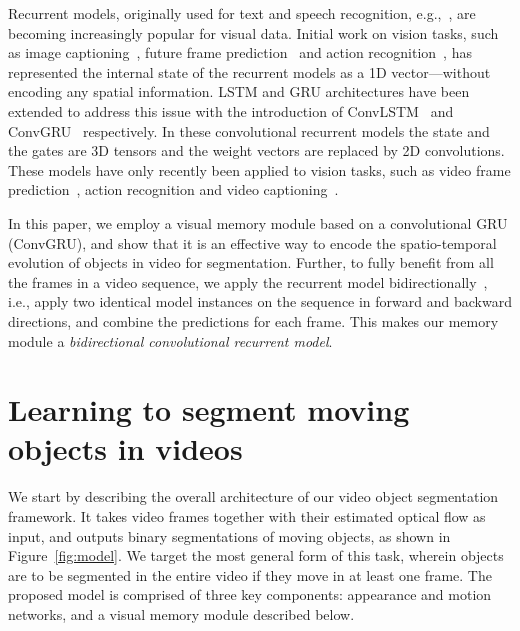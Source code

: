Recurrent models, originally used for text and speech recognition,
e.g.,~\cite{graves2013speech,mikolov2010recurrent}, are becoming increasingly
popular for visual data. Initial work on vision tasks, such as image
captioning~\cite{donahue2015long}, future frame
prediction~\cite{srivastava2015unsupervised} and action
recognition~\cite{NgHVVMT15}, has represented the internal state of the
recurrent models as a 1D vector---without encoding any spatial information.
LSTM and GRU architectures have been extended to address this issue with the
introduction of ConvLSTM~\cite{xingjian2015convolutional,patraucean2015spatio,finn2016unsupervised}
and ConvGRU~\cite{ballas2015delving} respectively. In
these convolutional recurrent models the state and the gates are 3D tensors and
the weight vectors are replaced by 2D convolutions. These models have only
recently been applied to vision tasks, such as video frame
prediction~\cite{finn2016unsupervised,patraucean2015spatio,xingjian2015convolutional},
action recognition and video captioning~\cite{ballas2015delving}.

In this paper, we employ a visual memory module based on a convolutional GRU
(ConvGRU), and show that it is an effective way to encode the
spatio-temporal evolution of objects in video for segmentation. Further, to
fully benefit from all the frames in a video sequence, we apply the recurrent
model bidirectionally~\cite{graves2005framewise,graves2013hybrid}, i.e., apply
two identical model instances on the sequence in forward and backward
directions, and combine the predictions for each frame. This makes our memory
module a {\it bidirectional convolutional recurrent model}.

\section{Learning to segment moving objects in videos}
\label{sec:fullmodel}
We start by describing the overall architecture of our video object
segmentation framework. It takes video frames together with their estimated
optical flow as input, and outputs binary segmentations of moving objects, as
shown in Figure~\ref{fig:model}. We target the most general form of this task,
wherein objects are to be segmented in the entire video if they move in at
least one frame. The proposed model is comprised of three key components:
appearance and motion networks, and a visual memory module described below.

